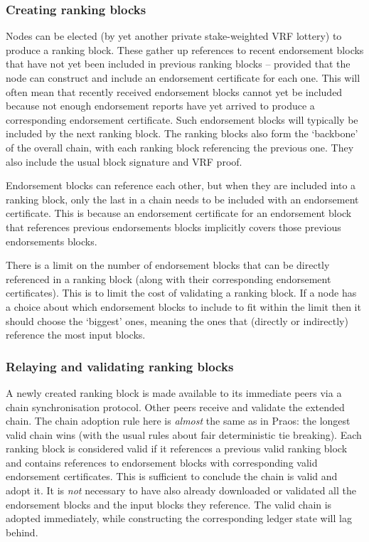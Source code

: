 \documentclass[11pt,a4paper]{article}
\begin{document}
\subsubsection{Creating ranking blocks}
\label{creating-ranking-blocks}
Nodes can be elected (by yet another private stake-weighted VRF lottery) to
produce a ranking block. These gather up references to recent endorsement
blocks that have not yet been included in previous ranking blocks -- provided
that the node can construct and include an endorsement certificate for each one.
This will often mean that recently received endorsement blocks cannot yet be
included because not enough endorsement reports have yet arrived to produce a
corresponding endorsement certificate. Such endorsement blocks will typically
be included by the next ranking block. The ranking blocks also form the
`backbone' of the overall chain, with each ranking block referencing the
previous one. They also include the usual block signature and VRF proof.

Endorsement blocks can reference each other, but when they are included into a
ranking block, only the last in a chain needs to be included with an
endorsement certificate. This is because an endorsement certificate for an
endorsement block that references previous endorsements blocks implicitly
covers those previous endorsements blocks.

There is a limit on the number of endorsement blocks that can be directly
referenced in a ranking block (along with their corresponding endorsement
certificates). This is to limit the cost of validating a ranking block. If a
node has a choice about which endorsement blocks to include to fit within the
limit then it should choose the `biggest' ones, meaning the ones that (directly
or indirectly) reference the most input blocks.

\subsubsection{Relaying and validating ranking blocks}
A newly created ranking block is made available to its immediate peers via a
chain synchronisation protocol. Other peers receive and validate the extended
chain. The chain adoption rule here is \emph{almost} the same as in Praos: the
longest valid chain wins (with the usual rules about fair deterministic tie
breaking). Each ranking block is considered valid if it references a previous
valid ranking block and contains references to endorsement blocks with
corresponding valid endorsement certificates. This is sufficient to conclude
the chain is valid and adopt it. It is \emph{not} necessary to have also
already downloaded or validated all the endorsement blocks and the input blocks
they reference. The valid chain is adopted immediately, while constructing the
corresponding ledger state will lag behind.
\end{document}
